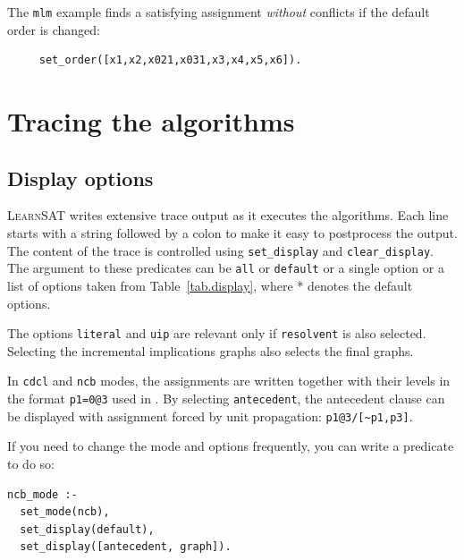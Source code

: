 \documentclass[11pt]{report}
\newcommand*{\p}[1]{\textup{\texttt{#1}}}
\newcommand*{\ls}{\textsc{LearnSAT}}
\begin{document}
The \p{mlm} example finds a satisfying assignment \emph{without}
conflicts if the default order is changed:

\begin{verbatim}
     set_order([x1,x2,x021,x031,x3,x4,x5,x6]).
\end{verbatim}

\section{Tracing the algorithms}

\subsection{Display options}

\ls{} writes extensive trace output as it executes the algorithms. Each
line starts with a string followed by a colon to make it easy to
postprocess the output. The content of the trace is controlled using
\p{set\_display} and \p{clear\_display}. The argument to these
predicates can be \p{all} or \p{default} or a single option or a list of
options taken from Table~\ref{tab.display}, where * denotes the default
options.

The options \p{literal} and \p{uip} are relevant only if \p{resolvent}
is also selected. Selecting the incremental implications graphs also
selects the final graphs.

In \p{cdcl} and \p{ncb} modes, the assignments are written together with
their levels in the format \p{p1=0@3} used in \cite{mlm}.
By selecting \p{antecedent}, the antecedent clause can be displayed with
assignment forced by unit propagation:
\verb+p1@3/[~p1,p3]+.

If you need to change the mode and options frequently, you
can write a predicate to do so:
\begin{verbatim}
ncb_mode :-
  set_mode(ncb),
  set_display(default),
  set_display([antecedent, graph]).
\end{verbatim}
\end{document}
